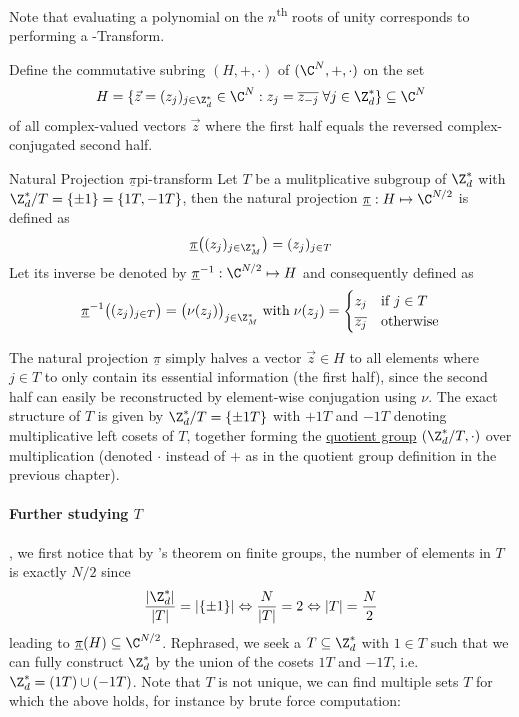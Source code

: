 Note that evaluating a polynomial on the $n$\textsuperscript{th} roots of unity corresponds to performing a -Transform.

Define the commutative subring $(H, +, \cdot)$ of $(\C^N, +, \cdot)$ on the set
$$H = \{\vec{z} = (z_j)_{j \in \Z_d^*} \in \C^N : z_j = \overline{z_{-j}} \;\forall j \in \Z_d^*\} \subseteq \C^N$$
of all complex-valued vectors $\vec{z}$ where the first half equals the reversed complex-conjugated second half.

\begin{definition}{Natural Projection $\underline{\pi}$}{pi-transform}
  Let $T$ be a mulitplicative subgroup of $\Z_d^*$ with $\Z_d^* / T = \{\pm 1\} = \{1T, -1T\}$, then the natural projection $\underline{\pi}: H \mapsto \C^{N/2}$ is defined as
  $$\underline{\pi}\big((z_j)_{j \in \Z_M^*}\big) = (z_j)_{j \in T}$$
  Let its inverse be denoted by $\underline{\pi}\inv: \C^{N/2} \mapsto H$ and consequently defined as
  $$\underline{\pi}\inv\big((z_j)_{j \in T}\big) = \big(\nu(z_j)\big)_{j \in \Z_M^*} \; \mathrm{with} \; \nu(z_j) = \begin{cases}
      z_j            & \text{if } j \in T \\
      \overline{z_j} & \text{otherwise}
    \end{cases}$$
\end{definition}

The natural projection $\underline{\pi}$ simply halves a vector $\vec{z} \in H$ to all elements where $j \in T$ to only contain its essential information (the first half), since the second half can easily be reconstructed by element-wise conjugation using $\nu$.
The exact structure of $T$ is given by $\Z_d^* / T = \{\pm 1T\}$ with $+1T$ and $-1T$ denoting multiplicative left cosets of $T$, together forming the \hyperref[def:quotient-group]{quotient group} $(\Z_d^* / T, \cdot)$ over multiplication (denoted $\cdot$ instead of $+$ as in the quotient group definition in the previous chapter).

\paragraph{Further studying $T$},
we first notice that by 's theorem on finite groups, the number of elements in $T$ is exactly $N / 2$ since $$\frac{|\Z_d^*|}{|T|} = |\{\pm 1\}| \Leftrightarrow \frac{N}{|T|} = 2 \Leftrightarrow |T| = \frac{N}{2}$$ leading to $\underline{\pi}(H) \subseteq \C^{N/2}$.
Rephrased, we seek a $T \subseteq \Z_d^*$ with $1 \in T$ such that we can fully construct $\Z_d^*$ by the union of the cosets $1T$ and $-1T$, i.e. $\Z_d^* = (1T) \cup (-1T)$.
Note that $T$ is not unique, we can find multiple sets $T$ for which the above holds, for instance by brute force computation:

